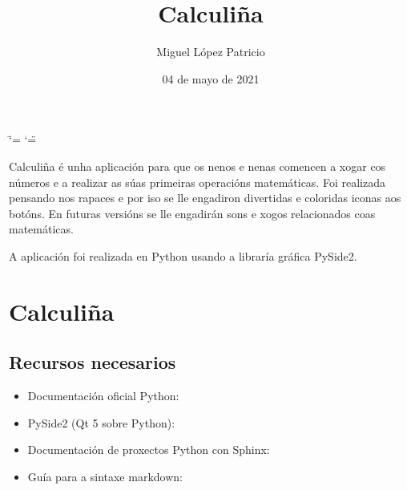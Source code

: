 \documentclass[letterpaper,10pt,spanish]{sphinxmanual}
\title{Calculiña}
\date{04 de mayo de 2021}
\author{Miguel López Patricio}
\let\sphinxpxdimen\pdfpxdimen\else\newdimen\sphinxpxdimen
\begin{document}
\ifdefined\shorthandoff
  \ifnum\catcode`\=\string=\active\shorthandoff{=}\fi
  \ifnum\catcode`\"=\active{}\fi
\fi

\pagestyle{empty}
\sphinxmaketitle
\pagestyle{plain}
\sphinxtableofcontents
\pagestyle{normal}
\label{\detokenize{index::doc}}


\sphinxAtStartPar
Calculiña é unha aplicación para que os nenos e nenas comencen a xogar cos números
e a realizar as súas primeiras operacións matemáticas.
Foi realizada pensando nos rapaces e por iso se lle engadiron divertidas e coloridas iconas aos botóns.
En futuras versións se lle engadirán sons e xogos relacionados coas matemáticas.

\sphinxAtStartPar
A aplicación foi realizada en Python usando a libraría gráfica PySide2.

\noindent\sphinxincludegraphics[width=350\sphinxpxdimen]{{calculinha}.jpg}


\chapter{Calculiña}
\label{\detokenize{README:calculina}}\label{\detokenize{README::doc}}
\begin{figure}[htbp]
\centering

\noindent{}
\end{figure}


\section{Recursos necesarios}
\label{\detokenize{README:recursos-necesarios}}\begin{itemize}
\item {} 
\sphinxAtStartPar
Documentación oficial Python:

\item {} 
\sphinxAtStartPar
PySide2 (Qt 5 sobre Python):

\item {} 
\sphinxAtStartPar
Documentación de proxectos Python con Sphinx:

\item {} 
\sphinxAtStartPar
Guía para a sintaxe markdown:

\end{itemize}
\end{document}
